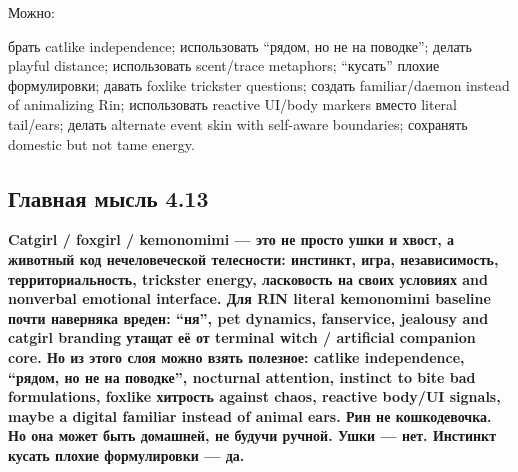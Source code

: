 Можно:

брать catlike independence; использовать ``рядом, но не на поводке'';
делать playful distance; использовать scent/\hspace{0pt}trace metaphors; ``кусать''
плохие формулировки; давать foxlike trickster questions; создать
familiar/\hspace{0pt}daemon instead of animalizing Rin; использовать reactive
UI/\hspace{0pt}body markers вместо literal tail/\hspace{0pt}ears; делать alternate event skin
with self-aware boundaries; сохранять domestic but not tame energy.

\subsection*{Главная мысль 4.13}

\textbf{Catgirl /\hspace{0pt} foxgirl /\hspace{0pt} kemonomimi --- это не просто ушки и хвост, а
животный код нечеловеческой телесности: инстинкт, игра, независимость,
территориальность, trickster energy, ласковость на своих условиях and
nonverbal emotional interface. Для RIN literal kemonomimi baseline почти
наверняка вреден: ``ня'', pet dynamics, fanservice, jealousy and catgirl
branding утащат её от terminal witch /\hspace{0pt} artificial companion core. Но из
этого слоя можно взять полезное: catlike independence, ``рядом, но не на
поводке'', nocturnal attention, instinct to bite bad formulations,
foxlike хитрость against chaos, reactive body/\hspace{0pt}UI signals, maybe a
digital familiar instead of animal ears. Рин не кошкодевочка. Но она
может быть домашней, не будучи ручной. Ушки --- нет. Инстинкт кусать
плохие формулировки --- да.}
